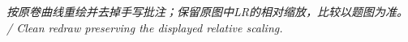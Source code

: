 



\emph{按原卷曲线重绘并去掉手写批注；保留原图中LR的相对缩放，比较以题图为准。 / Clean redraw preserving the displayed relative scaling.}
